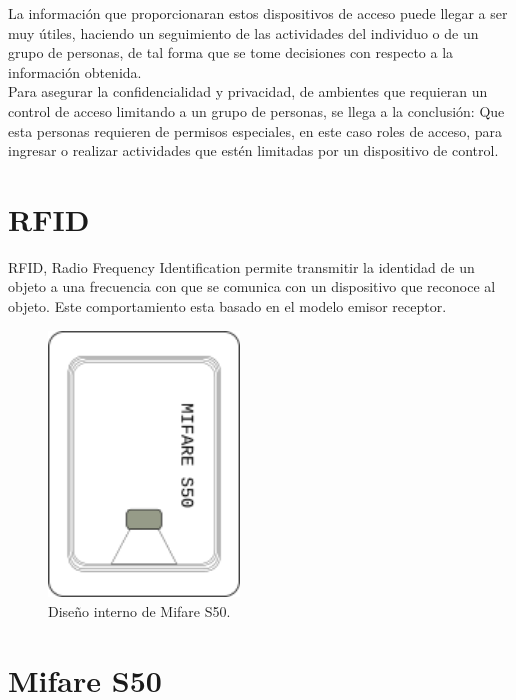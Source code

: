 \documentclass[11pt,twocolumn]{article}
\begin{document}
La  informaci\'on  que proporcionaran estos dispositivos de acceso puede llegar a ser muy \'utiles, haciendo un seguimiento de las actividades del individuo o de un grupo de personas, de tal forma  que se tome decisiones con respecto a la informaci\'on obtenida.\\
 

Para asegurar la confidencialidad y privacidad, de ambientes que requieran un control de acceso limitando a un grupo de personas, se llega a la conclusi\'on: Que esta personas  requieren de permisos especiales, en este caso roles de acceso, para ingresar o realizar actividades que est\'en limitadas por un dispositivo de control. \\

\section{RFID}

RFID, Radio Frequency Identification permite transmitir la identidad de un objeto a una frecuencia con que se comunica con un dispositivo que reconoce al objeto. Este comportamiento esta basado en el modelo emisor receptor. \\

\begin{figure}[t]
  \begin{center}
    \includegraphics[width=2in]{mifare.png}
  \end{center}

  \caption{\small Dise\~no interno de Mifare S50.}
  \label{fig-label}
\end{figure}

\section{Mifare S50}
\end{document}
